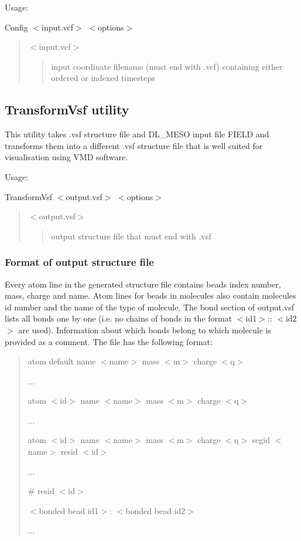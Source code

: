 Usage\+:

{\ttfamily Config $<$input.\+vcf$>$ $<$options$>$}

\begin{quote}
{\ttfamily $<$input.\+vcf$>$} \begin{quote}
input coordinate filename (must end with {\ttfamily .vcf}) containing either ordered or indexed timesteps \end{quote}
\end{quote}
\hypertarget{Common_TransformVsf}{}\subsection{Transform\+Vsf utility}\label{Common_TransformVsf}
This utility takes {\ttfamily .vsf} structure file and D\+L\+\_\+\+M\+E\+SO input file {\ttfamily F\+I\+E\+LD} and transforms them into a different {\ttfamily .vsf} structure file that is well suited for visualisation using V\+MD software.

Usage\+:

{\ttfamily Transform\+Vsf $<$output.\+vsf$>$ $<$options$>$}

\begin{quote}
{\ttfamily $<$output.\+vsf$>$} \begin{quote}
output structure file that must end with {\ttfamily .vsf} \end{quote}
\end{quote}
\hypertarget{Common_TransformVsf-output}{}\subsubsection{Format of output structure file}\label{Common_TransformVsf-output}
Every atom line in the generated structure file contains bead\textquotesingle{}s index number, mass, charge and name. Atom lines for beads in molecules also contain molecule\textquotesingle{}s id number and the name of the type of molecule. The bond section of {\ttfamily output.\+vsf} lists all bonds one by one (i.\+e. no chains of bonds in the format {\ttfamily $<$id1$>$\+:\+: $<$id2$>$} are used). Information about which bonds belong to which molecule is provided as a comment. The file has the following format\+: \begin{quote}
{\ttfamily atom default name $<$name$>$ mass $<$m$>$ charge $<$q$>$}

{\ttfamily ...}

{\ttfamily atom $<$id$>$ name $<$name$>$ mass $<$m$>$ charge $<$q$>$}

{\ttfamily ...}

{\ttfamily atom $<$id$>$ name $<$name$>$ mass $<$m$>$ charge $<$q$>$ segid $<$name$>$ resid $<$id$>$}

{\ttfamily ...}

{\ttfamily \# resid $<$id$>$}

{\ttfamily $<$bonded bead id1$>$\+: $<$bonded bead id2$>$}

{\ttfamily ...} \end{quote}


